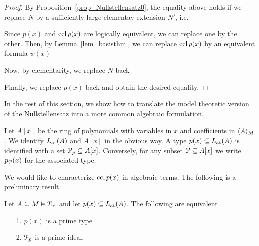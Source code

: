\begin{proof}
  By Proposition~\ref{prop_Nullstellensatz0}, the equality above holds if we replace $N$ by a sufficiently large elementay extension $N'$, i.e.
  
  
  Since $p(x)$ and $\ccl\,p(x)$ are logically equivalent, we can replace one by the other.
  Then, by Lemma~\ref{lem_basisthm}, we can replace $\ccl\,p(x)$ by an equivalent formula $\psi(x)$
  
  
  Now, by elementarity, we replace $N$ back


  Finally, we replace $p(x)$ back and obtain the desired equality.
\end{proof}

In the rest of this section, we show how to translate the model theoretic version of the Nullstellensatz into a more common algebraic formulation.

Let $A[x]$ be the ring of polynomials with variables in $x$ and coefficients in $\<A\>_M$.
%
We identify $\atL(A)$ and $A[x]$ in the obvious way.
%
A type $p(x)\subseteq\atL(A)$ is identified with a set $\P_p\subseteq A[x]$.
Conversely, for any subset $\P\subseteq A[x]$ we write $p_\P(x)$ for the associated type.

We would like to characterize $\ccl\,p(x)$ in algebraic terms.
The following is a preliminary result.

\begin{proposition}\label{prop_tipi_e_ideali_primi}
  Let $A\subseteq M\models T_{\rm id}$ and let $p(x)\subseteq\atL(A)$.
  The following are equivalent
  \begin{itemize}
  \item[1.] $p(x)$ is a prime type
  \item[2.] $\P_p$ is a prime ideal.
  \end{itemize}
\end{proposition}

